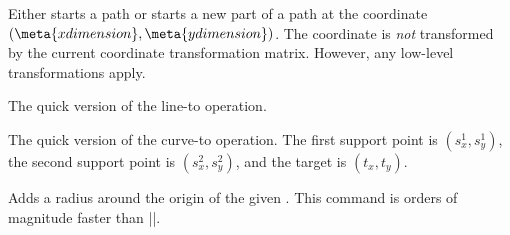 \begin{command}{\pgfpathqmoveto{}}
  Either starts a path or starts a new part of a path at the coordinate
  $(\meta{x dimension},\meta{y dimension})$. The coordinate is
  \emph{not} transformed by the current coordinate transformation
  matrix. However, any low-level transformations apply.

\begin{codeexample}[]
\end{codeexample}
\end{command}

\begin{command}{\pgfpathqlineto{}}
  The quick version of the line-to operation.
\end{command}

\begin{command}{\pgfpathqcurveto{}}
  The quick version of the curve-to operation. The first support point
  is $(s^1_x,s^1_y)$, the second support point is  $(s^2_x,s^2_y)$,
  and the target is $(t_x,t_y)$.
 
\begin{codeexample}[]
\end{codeexample}
\end{command}

\begin{command}{\pgfpathqcircle{}}
  Adds a radius around the origin of the given . This
  command is orders of magnitude faster than
  ||. 
 
\begin{codeexample}[]
\end{codeexample}
\end{command}



